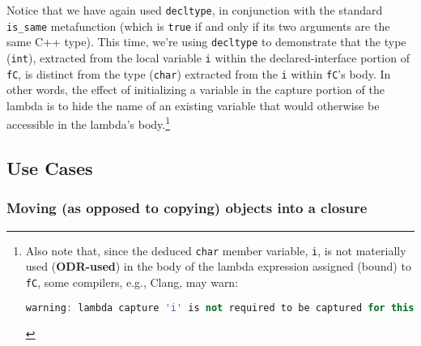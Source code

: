 \noindent Notice that we have again used \texttt{decltype}, in conjunction with
the standard \texttt{is\_same} metafunction (which is \texttt{true} if
and only if its two arguments are the same C++ type). This time, we're using \texttt{decltype} to
demonstrate that the type (\texttt{int}), extracted from the local
variable \texttt{i} within the declared-interface portion of
\texttt{fC}, is distinct from the type (\texttt{char}) extracted from
the \texttt{i} within \texttt{fC}'s body. In other words, the effect
of initializing a variable in the capture portion of the lambda is to
hide the name of an existing variable that would otherwise be accessible
in the lambda's body.{\cprotect\footnote{Also note that, since the
deduced \texttt{char} member variable, \texttt{i}, is not materially
used (\textbf{ODR-used}) in the body of the lambda expression assigned
(bound) to \texttt{fC}, some compilers, e.g., Clang, may warn:

\begin{lstlisting}[language=C++, basicstyle={\ttfamily\footnotesize}]
warning: lambda capture 'i' is not required to be captured for this use
\end{lstlisting}
      }}

\subsection[Use Cases]{Use Cases}\label{use-cases-lambdacapture}

\subsubsection[Moving (as opposed to copying) objects into a closure]{Moving (as opposed to copying) objects into a closure}\label{moving-(as-opposed-to-copying)-objects-into-a-closure}

